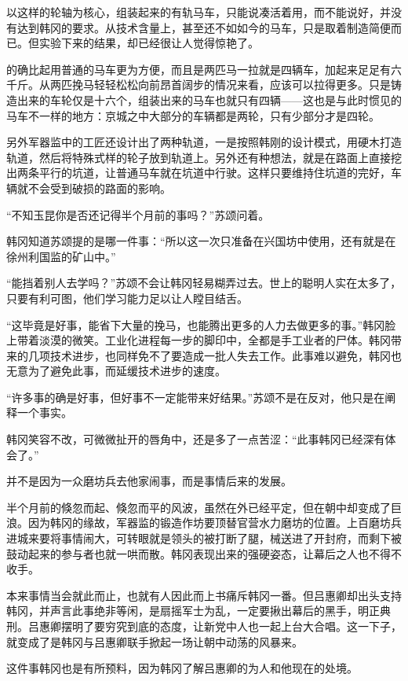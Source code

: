 以这样的轮轴为核心，组装起来的有轨马车，只能说凑活着用，而不能说好，并没有达到韩冈的要求。从技术含量上，甚至还不如如今的马车，只是取着制造简便而已。但实验下来的结果，却已经很让人觉得惊艳了。

的确比起用普通的马车更为方便，而且是两匹马一拉就是四辆车，加起来足足有六千斤。从两匹挽马轻轻松松向前昂首阔步的情况来看，应该可以拉得更多。只是铸造出来的车轮仅是十六个，组装出来的马车也就只有四辆——这也是与此时惯见的马车不一样的地方：京城之中大部分的车辆都是两轮，只有少部分才是四轮。

另外军器监中的工匠还设计出了两种轨道，一是按照韩刚的设计模式，用硬木打造轨道，然后将特殊式样的轮子放到轨道上。另外还有种想法，就是在路面上直接挖出两条平行的坑道，让普通马车就在坑道中行驶。这样只要维持住坑道的完好，车辆就不会受到破损的路面的影响。

“不知玉昆你是否还记得半个月前的事吗？”苏颂问着。

韩冈知道苏颂提的是哪一件事：“所以这一次只准备在兴国坊中使用，还有就是在徐州利国监的矿山中。”

“能挡着别人去学吗？”苏颂不会让韩冈轻易糊弄过去。世上的聪明人实在太多了，只要有利可图，他们学习能力足以让人瞠目结舌。

“这毕竟是好事，能省下大量的挽马，也能腾出更多的人力去做更多的事。”韩冈脸上带着淡漠的微笑。工业化进程每一步的脚印中，全都是手工业者的尸体。韩冈带来的几项技术进步，也同样免不了要造成一批人失去工作。此事难以避免，韩冈也无意为了避免此事，而延缓技术进步的速度。

“许多事的确是好事，但好事不一定能带来好结果。”苏颂不是在反对，他只是在阐释一个事实。

韩冈笑容不改，可微微扯开的唇角中，还是多了一点苦涩：“此事韩冈已经深有体会了。”

并不是因为一众磨坊兵去他家闹事，而是事情后来的发展。

半个月前的倏忽而起、倏忽而平的风波，虽然在外已经平定，但在朝中却变成了巨浪。因为韩冈的缘故，军器监的锻造作坊要顶替官营水力磨坊的位置。上百磨坊兵进城来要将事情闹大，可转眼就是领头的被打断了腿，械送进了开封府，而剩下被鼓动起来的参与者也就一哄而散。韩冈表现出来的强硬姿态，让幕后之人也不得不收手。

本来事情当会就此而止，也就有人因此而上书痛斥韩冈一番。但吕惠卿却出头支持韩冈，并声言此事绝非等闲，是扇摇军士为乱，一定要揪出幕后的黑手，明正典刑。吕惠卿摆明了要穷究到底的态度，让新党中人也一起上台大合唱。这一下子，就变成了是韩冈与吕惠卿联手掀起一场让朝中动荡的风暴来。

这件事韩冈也是有所预料，因为韩冈了解吕惠卿的为人和他现在的处境。

